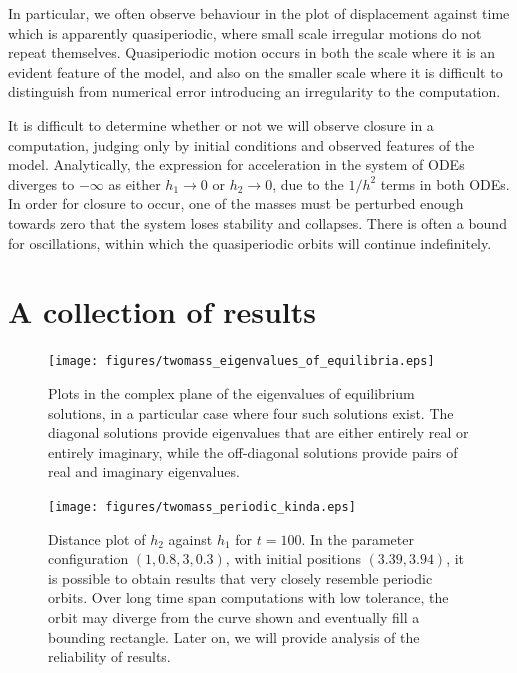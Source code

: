 In particular, we often observe behaviour in the plot of displacement against time which is apparently quasiperiodic,
where small scale irregular motions do not repeat themselves.
Quasiperiodic motion occurs in both the scale where it is an evident feature of the model,
and also on the smaller scale where it is difficult to distinguish from numerical error introducing an irregularity to the computation.

It is difficult to determine whether or not we will observe closure in a computation,
judging only by initial conditions and observed features of the model.
Analytically, the expression for acceleration in the system of ODEs diverges to $-\infty$ as either \(h_1\rightarrow 0\) or \(h_2 \rightarrow 0\),
due to the \(1/h^2\) terms in both ODEs.
In order for closure to occur,
one of the masses must be perturbed enough towards zero that the system loses stability and collapses.
There is often a bound for oscillations, within which the quasiperiodic orbits will continue indefinitely.

\section{A collection of results}

\begin{figure}[h!]
    \centering
    \texttt{[image: figures/twomass\_eigenvalues\_of\_equilibria.eps]}
    \caption{
        Plots in the complex plane of the eigenvalues of equilibrium solutions,
        in a particular case where four such solutions exist.
        The diagonal solutions provide eigenvalues that are either entirely real or entirely imaginary,
        while the off-diagonal solutions provide pairs of real and imaginary eigenvalues.
    }
    \label{fig:twomass_argand_eigenvalues}
\end{figure}

\begin{figure}[h!]
    \centering
    \texttt{[image: figures/twomass\_periodic\_kinda.eps]}
    \caption{
        Distance plot of $h_2$ against $h_1$ for $t=100$.
        In the parameter configuration \((1,0.8,3,0.3)\), with initial positions $(3.39,3.94)$,
        it is possible to obtain results that very closely resemble periodic orbits.
        Over long time span computations with low tolerance, the orbit may diverge from the curve shown and eventually fill a bounding rectangle. Later on, we will provide analysis of the reliability of results.
    }
    \label{fig:twomass_semiperiodic}
\end{figure}

